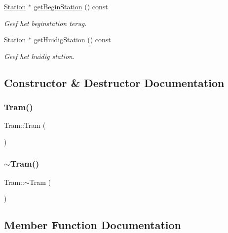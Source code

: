\begin{DoxyCompactItemize}
\hyperlink{class_station}{Station} $\ast$ \hyperlink{class_tram_abe386592de6a7930df75ea184b945403}{get\+Begin\+Station} () const
\begin{DoxyCompactList}\small\item\em Geef het beginstation terug. \end{DoxyCompactList}\item 
\hyperlink{class_station}{Station} $\ast$ \hyperlink{class_tram_ad04f5905ffec6ef4069b27f08c63f4b9}{get\+Huidig\+Station} () const
\begin{DoxyCompactList}\small\item\em Geef het huidig station. \end{DoxyCompactList}\end{DoxyCompactItemize}


\subsection{Constructor \& Destructor Documentation}
\mbox{\label{class_tram_aad83b2e7e79d57528691bf317ab0e1ef}} 
\subsubsection{\texorpdfstring{Tram()}{Tram()}}
{\footnotesize\ttfamily Tram\+::\+Tram (\begin{DoxyParamCaption}{ }\end{DoxyParamCaption})}

\mbox{\label{class_tram_acd6056d2289f2dccd371bc226cd2cb17}} 
\subsubsection{\texorpdfstring{$\sim$\+Tram()}{~Tram()}}
{\footnotesize\ttfamily Tram\+::$\sim$\+Tram (\begin{DoxyParamCaption}{ }\end{DoxyParamCaption})\hspace{0.3cm}{\ttfamily [virtual]}}



\subsection{Member Function Documentation}
\mbox{\label{class_tram_abe386592de6a7930df75ea184b945403}} 
